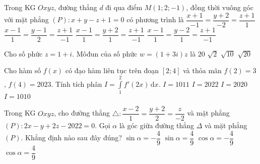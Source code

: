 \begin{ex}%
Trong KG $Oxyz$, đường thẳng $d$ đi qua điểm $M(1;2;-1)$, đồng thời vuông góc với mặt phẳng $(P)\colon x+y-z+1=0$ có phương trình là
\choice
{$\dfrac{x+1}{-1}=\dfrac{y+2}{-2}=\dfrac{z+1}{1}$}
{$\dfrac{x-1}{1}=\dfrac{y-1}{2}=\dfrac{z+1}{-1}$}
{$\dfrac{x-1}{1}=\dfrac{y+2}{1}=\dfrac{z+1}{-1}$}
{\True $\dfrac{x-1}{1}=\dfrac{y-2}{1}=\dfrac{z+1}{-1}$}
\end{ex}


\begin{ex}%
Cho số phức $z=1+i$. Môđun của số phức $w=(1+3i)z$ là
\choice
{$ 20 $}
{$\sqrt{2}$}
{$\sqrt{10}$}
{\True $\sqrt{20}$}
\end{ex}


\begin{ex}%
Cho hàm số $f(x)$ có đạo hàm liên tục trên đoạn $[2;4]$ và thỏa mãn $f(2)=3$, $f(4)=2023$. Tính tích phân $I=\displaystyle\int\limits_1^2{f'(2x)\mathrm{\,d}x}$.
\choice
{$I=1011$}
{$I=2022$}
{$I=2020$}
{\True $I=1010$}
\end{ex}


\begin{ex}%
Trong KG $Oxyz$, cho đường thẳng $\triangle \colon \dfrac{x-2}{1}=\dfrac{y+2}{2}=\dfrac{z}{-2}$ và mặt phẳng $(P)\colon 2x-y+2z-2022=0$. Gọi $\alpha $ là góc giữa đường thẳng $\Delta $ và mặt phẳng $(P)$. Khẳng định nào sau đây đúng?
\choice
{$\sin \alpha =-\dfrac{4}{9}$}
{\True $\sin \alpha =\dfrac{4}{9}$}
{$\cos \alpha =-\dfrac{4}{9}$}
{$\cos \alpha =\dfrac{4}{9}$}
\end{ex}


